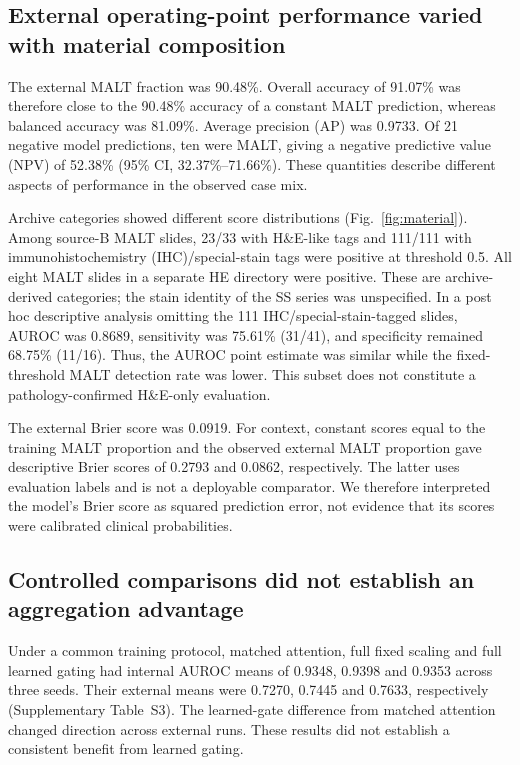 \subsection{External operating-point performance varied with material composition}
The external MALT fraction was 90.48\%. Overall accuracy of 91.07\% was therefore close to the 90.48\% accuracy of a constant MALT prediction, whereas balanced accuracy was 81.09\%. Average precision (AP) was 0.9733. Of 21 negative model predictions, ten were MALT, giving a negative predictive value (NPV) of 52.38\% (95\% CI, 32.37\%--71.66\%). These quantities describe different aspects of performance in the observed case mix.

Archive categories showed different score distributions (Fig.~\ref{fig:material}). Among source-B MALT slides, 23/33 with H\&E-like tags and 111/111 with immunohistochemistry (IHC)/special-stain tags were positive at threshold 0.5. All eight MALT slides in a separate HE directory were positive. These are archive-derived categories; the stain identity of the SS series was unspecified. In a post hoc descriptive analysis omitting the 111 IHC/special-stain-tagged slides, AUROC was 0.8689, sensitivity was 75.61\% (31/41), and specificity remained 68.75\% (11/16). Thus, the AUROC point estimate was similar while the fixed-threshold MALT detection rate was lower. This subset does not constitute a pathology-confirmed H\&E-only evaluation.

The external Brier score was 0.0919. For context, constant scores equal to the training MALT proportion and the observed external MALT proportion gave descriptive Brier scores of 0.2793 and 0.0862, respectively. The latter uses evaluation labels and is not a deployable comparator. We therefore interpreted the model's Brier score as squared prediction error, not evidence that its scores were calibrated clinical probabilities.


\subsection{Controlled comparisons did not establish an aggregation advantage}
Under a common training protocol, matched attention, full fixed scaling and full learned gating had internal AUROC means of 0.9348, 0.9398 and 0.9353 across three seeds. Their external means were 0.7270, 0.7445 and 0.7633, respectively (Supplementary Table~S3). The learned-gate difference from matched attention changed direction across external runs. These results did not establish a consistent benefit from learned gating.

